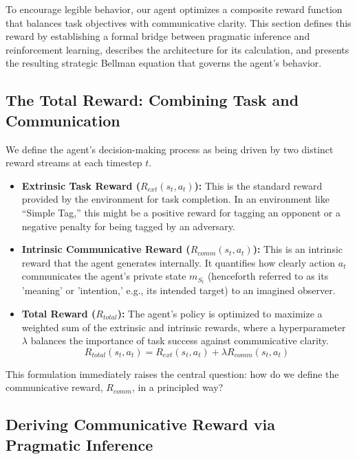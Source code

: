 \documentclass{article}
\begin{document}
To encourage legible behavior, our agent optimizes a composite reward function that balances task objectives with communicative clarity. This section defines this reward by establishing a formal bridge between pragmatic inference and reinforcement learning, describes the architecture for its calculation, and presents the resulting strategic Bellman equation that governs the agent's behavior.

\subsection{The Total Reward: Combining Task and Communication}
\label{ssec:total_reward}

We define the agent's decision-making process as being driven by two distinct reward streams at each timestep $t$.

\begin{itemize}
    \item \textbf{Extrinsic Task Reward ($R_{ext}(s_t, a_t)$):} This is the standard reward provided by the environment for task completion. In an environment like ``Simple Tag,'' this might be a positive reward for tagging an opponent or a negative penalty for being tagged by an adversary.
    
    \item \textbf{Intrinsic Communicative Reward ($R_{comm}(s_t, a_t)$):} This is an intrinsic reward that the agent generates internally. It quantifies how clearly action $a_t$ communicates the agent's private state $m_{S_t}$ (henceforth referred to as its 'meaning' or 'intention,' e.g., its intended target) to an imagined observer.
    
    \item \textbf{Total Reward ($R_{total}$):} The agent's policy is optimized to maximize a weighted sum of the extrinsic and intrinsic rewards, where a hyperparameter $\lambda$ balances the importance of task success against communicative clarity.
    \begin{equation}
        R_{total}(s_t, a_t) = R_{ext}(s_t, a_t) + \lambda R_{comm}(s_t, a_t) \label{eq:total_reward}
    \end{equation}
\end{itemize}
This formulation immediately raises the central question: how do we define the communicative reward, $R_{comm}$, in a principled way?

\subsection{Deriving Communicative Reward via Pragmatic Inference}
\label{ssec:reward_derivation}
\end{document}
